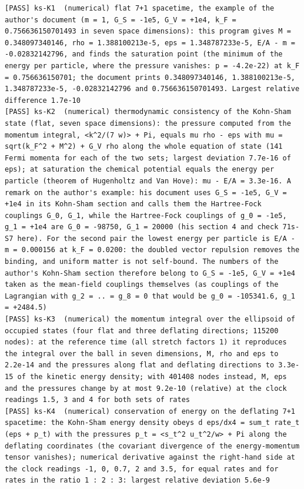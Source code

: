 \documentclass[
  10pt,
]{article}
\begin{document}
\begin{verbatim}
[PASS] ks-K1  (numerical) flat 7+1 spacetime, the example of the author's document (m = 1, G_S = -1e5, G_V = +1e4, k_F = 0.756636150701493 in seven space dimensions): this program gives M = 0.348097340146, rho = 1.388100213e-5, eps = 1.348787233e-5, E/A - m = -0.02832142796, and finds the saturation point (the minimum of the energy per particle, where the pressure vanishes: p = -4.2e-22) at k_F = 0.756636150701; the document prints 0.348097340146, 1.388100213e-5, 1.348787233e-5, -0.02832142796 and 0.756636150701493. Largest relative difference 1.7e-10
[PASS] ks-K2  (numerical) thermodynamic consistency of the Kohn-Sham state (flat, seven space dimensions): the pressure computed from the momentum integral, <k^2/(7 w)> + Pi, equals mu rho - eps with mu = sqrt(k_F^2 + M^2) + G_V rho along the whole equation of state (141 Fermi momenta for each of the two sets; largest deviation 7.7e-16 of eps); at saturation the chemical potential equals the energy per particle (theorem of Hugenholtz and Van Hove): mu - E/A = 3.3e-16. A remark on the author's example: his document uses G_S = -1e5, G_V = +1e4 in its Kohn-Sham section and calls them the Hartree-Fock couplings G_0, G_1, while the Hartree-Fock couplings of g_0 = -1e5, g_1 = +1e4 are G_0 = -98750, G_1 = 20000 (his section 4 and check 71s-S7 here). For the second pair the lowest energy per particle is E/A - m = 0.000156 at k_F = 0.0200: the doubled vector repulsion removes the binding, and uniform matter is not self-bound. The numbers of the author's Kohn-Sham section therefore belong to G_S = -1e5, G_V = +1e4 taken as the mean-field couplings themselves (as couplings of the Lagrangian with g_2 = .. = g_8 = 0 that would be g_0 = -105341.6, g_1 = +2484.5)
[PASS] ks-K3  (numerical) the momentum integral over the ellipsoid of occupied states (four flat and three deflating directions; 115200 nodes): at the reference time (all stretch factors 1) it reproduces the integral over the ball in seven dimensions, M, rho and eps to 2.2e-14 and the pressures along flat and deflating directions to 3.3e-15 of the kinetic energy density; with 401408 nodes instead, M, eps and the pressures change by at most 9.2e-10 (relative) at the clock readings 1.5, 3 and 4 for both sets of rates
[PASS] ks-K4  (numerical) conservation of energy on the deflating 7+1 spacetime: the Kohn-Sham energy density obeys d eps/dx4 = sum_t rate_t (eps + p_t) with the pressures p_t = <s_t^2 u_t^2/w> + Pi along the deflating coordinates (the covariant divergence of the energy-momentum tensor vanishes); numerical derivative against the right-hand side at the clock readings -1, 0, 0.7, 2 and 3.5, for equal rates and for rates in the ratio 1 : 2 : 3: largest relative deviation 5.6e-9

\end{verbatim}
\end{document}
